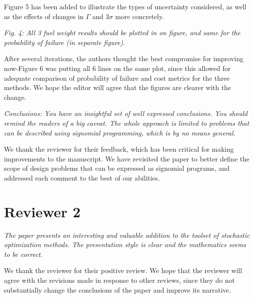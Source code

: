 \documentclass[11pt]{article}
\begin{document}
    Figure 5 has been added to illustrate the types of uncertainty considered,
    as well as the effects of changes in $\Gamma$ and $3\sigma$ more concretely.
    \bigskip

    \textit{Fig. 4: All 3 fuel weight results should be plotted in on figure,
    and same for the probability of failure (in separate figure).}

    After several iterations, the authors thought the best compromise for improving now-Figure 6
    was putting
    all 6 lines on the same plot, since this allowed for adequate comparison of probability of
    failure and cost metrics for the three methods. We hope the editor will agree that
    the figures are clearer with the change.
    \bigskip

    \textit{Conclusions: You have an insightful set of well expressed conclusions.
    You should remind the readers of a big caveat. The whole approach is limited to problems
    that can be described using signomial programming, which is by no means general.}

    We thank the reviewer for their feedback, which has been critical for making improvements to the manuscript. We
    have revisited the paper to better define the scope of design problems that can be expressed as signomial
    programs, and addressed each comment to the best of our abilities.
    \bigskip

    \section{Reviewer 2}

    \textit{The paper presents an interesting and valuable addition to the toolset of stochastic optimization methods.
    The presentation style is clear and the mathematics seems to be correct.}

    We thank the reviewer for their positive review. We hope that the reviewer
    will agree with the revisions made in response to other reviews, since
    they do not substantially change the conclusions of the paper
    and improve its narrative.
    \bigskip
\end{document}

